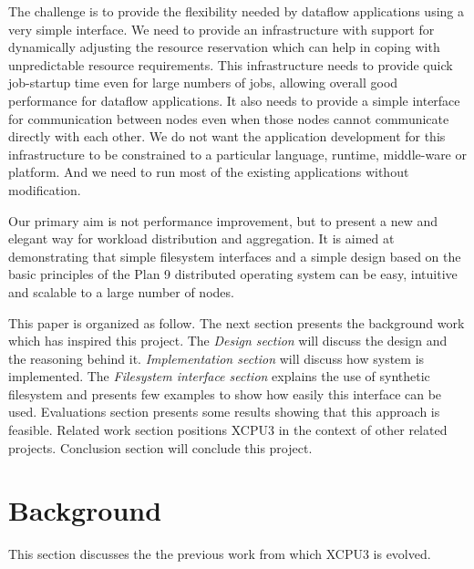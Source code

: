 \documentclass[conference]{IEEEtran}
\begin{document}
The challenge is to provide the flexibility needed by dataflow applications
using a very simple interface.  We need to provide an infrastructure with
support for dynamically adjusting the resource reservation which can help in
coping with unpredictable resource requirements.  This infrastructure needs to
provide quick job-startup time even for large numbers of jobs, allowing overall
good performance for dataflow applications.  It also needs to provide a simple
interface for communication between nodes even when those nodes cannot
communicate directly with each other. We do not want the application development
for this infrastructure to be constrained to a particular language, runtime,
middle-ware or platform.  And we need to run most of the existing applications
without modification.


Our primary aim is not performance improvement, but to present a new and elegant
way for workload distribution and aggregation.  It is aimed at demonstrating
that simple filesystem interfaces and a simple design based on the basic
principles of the Plan 9 \cite{pike95plan} distributed operating system can be
easy, intuitive and scalable to a large number of nodes.

This paper is organized as follow. The next section presents the background
work which has inspired this project. The \textit{Design section} will discuss
the design and the reasoning behind it. \textit{Implementation section} will
discuss how system is implemented. The \textit{Filesystem interface section}
explains the use of synthetic filesystem and presents few examples to show how
easily this interface can be used. Evaluations section presents some results
showing that this approach is feasible. Related work section positions XCPU3 in
the context of other related projects. Conclusion section will conclude this
project.



\section{Background}
This section discusses the the previous work from which XCPU3 is evolved.
\end{document}
